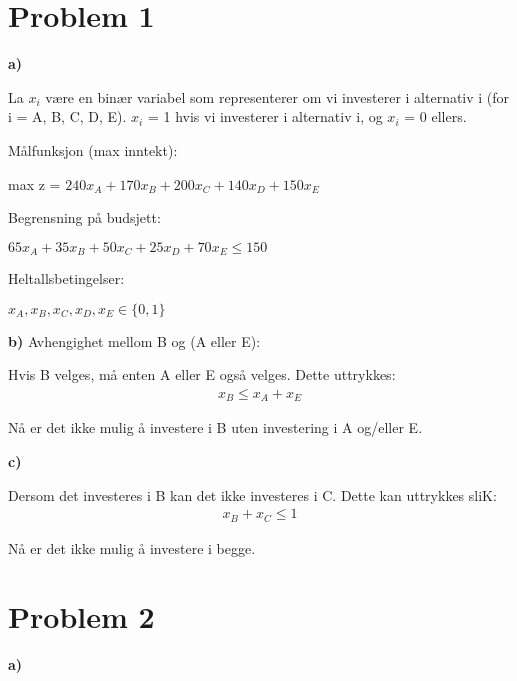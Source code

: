 \documentclass{article}
\begin{document}


\section*{\textbf{Problem 1}}
\vspace*{12pt}\small\textbf{a)}

La $x_i$ være en binær variabel som representerer om vi investerer i alternativ i (for i = A, B, C, D, E).
$x_i$ = 1 hvis vi investerer i alternativ i, og $x_i$ = 0 ellers.

\vspace*{12pt}
Målfunksjon (max inntekt):

max z = $240x_A + 170x_B + 200x_C + 140x_D + 150x_E$

\vspace*{12pt}
Begrensning på budsjett:

$65x_A + 35x_B + 50x_C + 25x_D + 70x_E \leq 150$

\vspace*{12pt}
Heltallsbetingelser:

$x_A, x_B, x_C, x_D, x_E \in \{0, 1\}$

\vspace*{12pt}\small\textbf{b)}
Avhengighet mellom B og (A eller E):

Hvis B velges, må enten A eller E også velges. Dette uttrykkes:
\begin{align*}
    x_B \leq  x_A + x_E
\end{align*}

Nå er det ikke mulig å investere i B uten investering i A og/eller E.

\vspace*{12pt}\small\textbf{c)}

Dersom det investeres i B kan det ikke investeres i C. Dette kan uttrykkes sliK:
\begin{align*}
    x_B + x_C \leq 1
\end{align*}

Nå er det ikke mulig å investere i begge.

\section*{\textbf{Problem 2}}
\vspace*{12pt}\small\textbf{a)}
\end{document}
